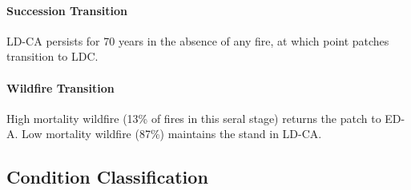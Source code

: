 \paragraph{Succession Transition} LD-CA persists for 70 years in the absence of any fire, at which point patches transition to LDC. 

\paragraph{Wildfire Transition} High mortality wildfire (13\% of fires in this seral stage) returns the patch to ED-A. Low mortality wildfire (87\%) maintains the stand in LD-CA. 

\noindent\hrulefill


\subsection*{Condition Classification}

